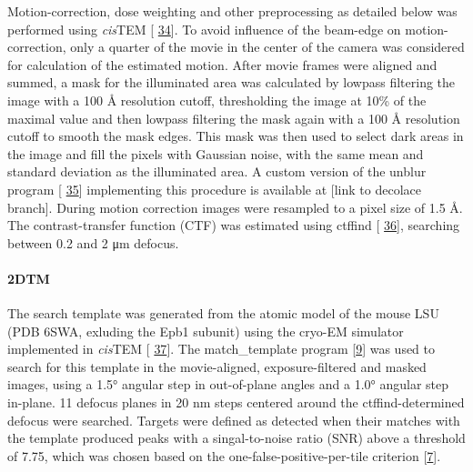 \documentclass[
]{article}
\providecommand{\DIFaddbegin}{} %
\providecommand{\DIFaddend}{} %
\providecommand{\DIFdelbegin}{} %
\providecommand{\DIFdelend}{} %
\newcommand{\DIFscaledelfig}{0.5}
\newlength{\DIFdelgraphicswidth} %
\newlength{\DIFdelgraphicsheight} %
\newcommand{\DIFaddincludegraphics}[2][]{{\color{blue}\fbox{\DIFOincludegraphics[#1]{#2}}}} %
\newcommand{\DIFdelincludegraphics}[2][]{%
\sbox{\DIFdelgraphicsbox}{\DIFOincludegraphics[#1]{#2}}%
\settoboxwidth{\DIFdelgraphicswidth}{\DIFdelgraphicsbox} %
\settoboxtotalheight{\DIFdelgraphicsheight}{\DIFdelgraphicsbox} %
\scalebox{\DIFscaledelfig}{%
\parbox[b]{\DIFdelgraphicswidth}{\usebox{\DIFdelgraphicsbox}\\[-\baselineskip] \rule{\DIFdelgraphicswidth}{0em}}\llap{\resizebox{\DIFdelgraphicswidth}{\DIFdelgraphicsheight}{%
\setlength{\unitlength}{\DIFdelgraphicswidth}%
\begin{picture}(1,1)%
\thicklines\linethickness{2pt} %
{\color[rgb]{1,0,0}\put(0,0){\framebox(1,1){}}}%
{\color[rgb]{1,0,0}\put(0,0){\line( 1,1){1}}}%
{\color[rgb]{1,0,0}\put(0,1){\line(1,-1){1}}}%
\end{picture}%
}\hspace*{3pt}}} %
} %
\DeclareRobustCommand{\DIFaddbegin}{\DIFOaddbegin \let\includegraphics\DIFaddincludegraphics} %
\DeclareRobustCommand{\DIFaddend}{\DIFOaddend \let\includegraphics\DIFOincludegraphics} %
\DeclareRobustCommand{\DIFdelbegin}{\DIFOdelbegin \let\includegraphics\DIFdelincludegraphics} %
\DeclareRobustCommand{\DIFdelend}{\DIFOaddend \let\includegraphics\DIFOincludegraphics} %
\begin{document}
Motion-correction, dose weighting and other preprocessing as detailed
below was performed using \emph{cis}TEM {[}\protect\DIFdelbegin %
\DIFdelend \DIFaddbegin \hyperlink{ref-MUY42yxp}{34}{]}\DIFaddend . To avoid
influence of the beam-edge on motion-correction, only a quarter of the
movie in the center of the camera was considered for calculation of the
estimated motion. After movie frames were aligned and summed, a mask for
the illuminated area was calculated by lowpass filtering the image with
a 100 Å resolution cutoff, thresholding the image at 10\% of the maximal
value and then lowpass filtering the mask again with a 100 Å resolution
cutoff to smooth the mask edges. This mask was then used to select dark
areas in the image and fill the pixels with Gaussian noise, with the
same mean and standard deviation as the illuminated area. A custom
version of the unblur program {[}\protect\DIFdelbegin %
\DIFdelend \DIFaddbegin \hyperlink{ref-1G4Y94qCy}{35}{]} \DIFaddend implementing
this procedure is available at {[}link to decolace branch{]}. During
motion correction images were resampled to a pixel size of 1.5 Å. The
contrast-transfer function (CTF) was estimated using ctffind
{[}\protect\DIFdelbegin %
\DIFdelend \DIFaddbegin \hyperlink{ref-n43f3Sqs}{36}{]}\DIFaddend , searching between 0.2 and 2 μm
defocus.

\hypertarget{dtm}{%
\paragraph{2DTM}\label{dtm}}

The search template was generated from the atomic model of the mouse LSU
(PDB 6SWA, exluding the Epb1 subunit) using the cryo-EM simulator
implemented in \emph{cis}TEM {[}\protect\DIFdelbegin %
\DIFdelend \DIFaddbegin \hyperlink{ref-q2PSamkS}{37}{]}\DIFaddend . The
match\_template program {[}\protect\hyperlink{ref-10bXZuF3G}{9}{]} was used to search for
this template in the movie-aligned, exposure-filtered and masked images,
using a 1.5° angular step in out-of-plane angles and a 1.0° angular step
in-plane. 11 defocus planes in 20 nm steps centered around the
ctffind-determined defocus were searched. Targets were defined as
detected when their matches with the template produced peaks with a
singal-to-noise ratio (SNR) above a threshold of 7.75, which was chosen
based on the one-false-positive-per-tile criterion
{[}\protect\hyperlink{ref-Ynb3IP6I}{7}{]}.
\end{document}
